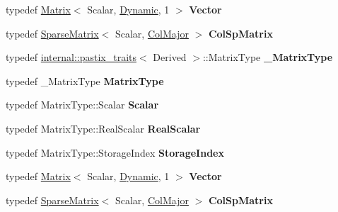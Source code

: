 \begin{DoxyCompactItemize}
typedef \hyperlink{group___core___module_class_eigen_1_1_matrix}{Matrix}$<$ Scalar, \hyperlink{namespace_eigen_ad81fa7195215a0ce30017dfac309f0b2}{Dynamic}, 1 $>$ {\bfseries Vector}
\item 
\mbox{\label{class_eigen_1_1_pastix_base_ae6d77f933f8777a77197ead483dbb4cf}} 
typedef \hyperlink{group___sparse_core___module_class_eigen_1_1_sparse_matrix}{Sparse\+Matrix}$<$ Scalar, \hyperlink{group__enums_ggaacded1a18ae58b0f554751f6cdf9eb13a0cbd4bdd0abcfc0224c5fcb5e4f6669a}{Col\+Major} $>$ {\bfseries Col\+Sp\+Matrix}
\item 
\mbox{\label{class_eigen_1_1_pastix_base_a3590da53cc9d964ebc0e7c1ef62860d5}} 
typedef \hyperlink{struct_eigen_1_1internal_1_1pastix__traits}{internal\+::pastix\+\_\+traits}$<$ Derived $>$\+::Matrix\+Type {\bfseries \+\_\+\+Matrix\+Type}
\item 
\mbox{\label{class_eigen_1_1_pastix_base_a6cd35cdf1999768f6d99465b466f6afd}} 
typedef \+\_\+\+Matrix\+Type {\bfseries Matrix\+Type}
\item 
\mbox{\label{class_eigen_1_1_pastix_base_a9f25544947ef1a53a24b60103e3971e0}} 
typedef Matrix\+Type\+::\+Scalar {\bfseries Scalar}
\item 
\mbox{\label{class_eigen_1_1_pastix_base_a3a5f114fdba041a4c588e0034eb989a5}} 
typedef Matrix\+Type\+::\+Real\+Scalar {\bfseries Real\+Scalar}
\item 
\mbox{\label{class_eigen_1_1_pastix_base_a2e10075626ec849c47c2360653e1a89d}} 
typedef Matrix\+Type\+::\+Storage\+Index {\bfseries Storage\+Index}
\item 
\mbox{\label{class_eigen_1_1_pastix_base_aabb830048edd554f4fbcadd85408d9ab}} 
typedef \hyperlink{group___core___module_class_eigen_1_1_matrix}{Matrix}$<$ Scalar, \hyperlink{namespace_eigen_ad81fa7195215a0ce30017dfac309f0b2}{Dynamic}, 1 $>$ {\bfseries Vector}
\item 
\mbox{\label{class_eigen_1_1_pastix_base_ae6d77f933f8777a77197ead483dbb4cf}} 
typedef \hyperlink{group___sparse_core___module_class_eigen_1_1_sparse_matrix}{Sparse\+Matrix}$<$ Scalar, \hyperlink{group__enums_ggaacded1a18ae58b0f554751f6cdf9eb13a0cbd4bdd0abcfc0224c5fcb5e4f6669a}{Col\+Major} $>$ {\bfseries Col\+Sp\+Matrix}
\end{DoxyCompactItemize}
